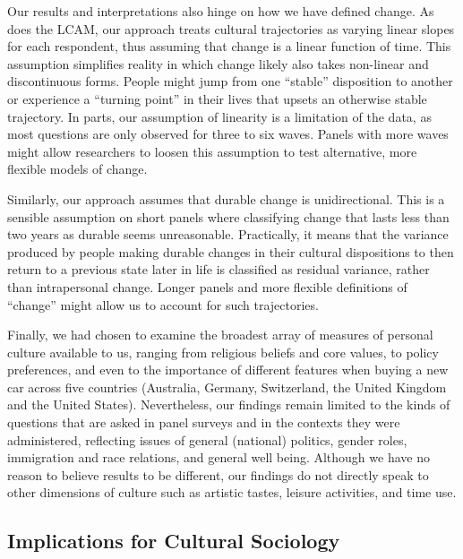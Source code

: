\documentclass[
  12pt,
]{article}
\begin{document}
Our results and interpretations also hinge on how we have defined
change. As does the LCAM, our approach treats cultural trajectories as
varying linear slopes for each respondent, thus assuming that change is
a linear function of time. This assumption simplifies reality in which
change likely also takes non-linear and discontinuous forms. People
might jump from one ``stable'' disposition to another or experience a
``turning point'' in their lives that upsets an otherwise stable
trajectory. In parts, our assumption of linearity is a limitation of the
data, as most questions are only observed for three to six waves. Panels
with more waves might allow researchers to loosen this assumption to
test alternative, more flexible models of change.

Similarly, our approach assumes that durable change is unidirectional.
This is a sensible assumption on short panels where classifying change
that lasts less than two years as durable seems unreasonable.
Practically, it means that the variance produced by people making
durable changes in their cultural dispositions to then return to a
previous state later in life is classified as residual variance, rather
than intrapersonal change. Longer panels and more flexible definitions
of ``change'' might allow us to account for such trajectories.

Finally, we had chosen to examine the broadest array of measures of
personal culture available to us, ranging from religious beliefs and
core values, to policy preferences, and even to the importance of
different features when buying a new car across five countries
(Australia, Germany, Switzerland, the United Kingdom and the United
States). Nevertheless, our findings remain limited to the kinds of
questions that are asked in panel surveys and in the contexts they were
administered, reflecting issues of general (national) politics, gender
roles, immigration and race relations, and general well being. Although
we have no reason to believe results to be different, our findings do
not directly speak to other dimensions of culture such as artistic
tastes, leisure activities, and time use.

\hypertarget{implications-for-cultural-sociology}{%
\subsection{Implications for Cultural
Sociology}\label{implications-for-cultural-sociology}}
\end{document}
